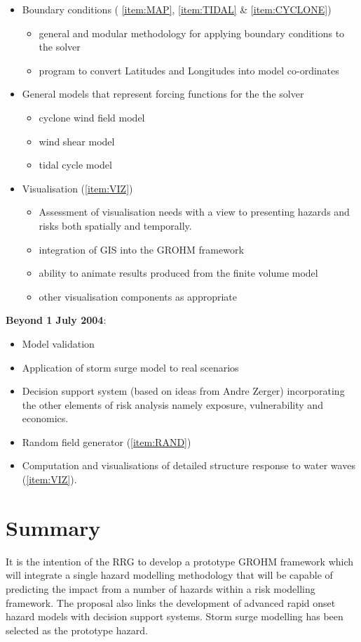 \documentclass{article}
\begin{document}
\begin{itemize}
  \item Boundary conditions
    ( \ref{item:MAP}, \ref{item:TIDAL} \& \ref{item:CYCLONE})
  \begin{itemize}
    \item general and modular methodology for applying boundary conditions
    to the solver
    \item program to convert Latitudes and Longitudes into model
    co-ordinates
  \end{itemize}
  \item General models that represent forcing functions for the the solver
  \begin{itemize}
  \item cyclone wind field model
  \item wind shear model
  \item tidal cycle model 
  \end{itemize}
\item
  Visualisation (\ref{item:VIZ})
  \begin{itemize}
    \item Assessment of visualisation needs with a view to presenting
      hazards and risks both spatially and temporally.
    \item integration of GIS into the GROHM framework
    \item ability to animate results produced from the
      finite volume model    
    \item other visualisation components as appropriate
  \end{itemize}

\end{itemize}

\noindent\textbf{Beyond 1 July 2004}:
\begin{itemize}
  \item Model validation
  \item Application of storm surge model to real scenarios
  \item Decision support system (based on ideas from
    Andre Zerger) incorporating the other elements of risk analysis
    namely exposure, vulnerability and economics.
  \item Random field generator (\ref{item:RAND})
  \item Computation and visualisations of detailed structure response to
  water waves (\ref{item:VIZ}).
\end{itemize}


\section{Summary}

It is the intention of the RRG to develop a prototype GROHM framework
which will integrate a single hazard modelling methodology that
will be capable of predicting the impact from a number of hazards
within a risk modelling framework. The proposal also links the
development of advanced rapid onset hazard models with decision
support systems. Storm surge modelling has been selected as the
prototype hazard.
\end{document}
